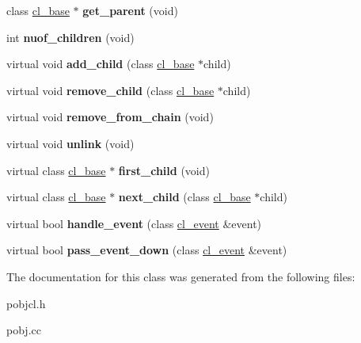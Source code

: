 \begin{DoxyCompactItemize}
\item 
\hypertarget{classcl__base_a9798c52f642c89b813e3535687948f79}{
class \hyperlink{classcl__base}{cl\_\-base} $\ast$ {\bfseries get\_\-parent} (void)}
\label{classcl__base_a9798c52f642c89b813e3535687948f79}

\item 
\hypertarget{classcl__base_a018e2c1c6ef01ca6576f72fbef615106}{
int {\bfseries nuof\_\-children} (void)}
\label{classcl__base_a018e2c1c6ef01ca6576f72fbef615106}

\item 
\hypertarget{classcl__base_a87e97f59dfbba7fcd46255ddd856116c}{
virtual void {\bfseries add\_\-child} (class \hyperlink{classcl__base}{cl\_\-base} $\ast$child)}
\label{classcl__base_a87e97f59dfbba7fcd46255ddd856116c}

\item 
\hypertarget{classcl__base_ab07d05ca13369e1e38a0654abf3d048a}{
virtual void {\bfseries remove\_\-child} (class \hyperlink{classcl__base}{cl\_\-base} $\ast$child)}
\label{classcl__base_ab07d05ca13369e1e38a0654abf3d048a}

\item 
\hypertarget{classcl__base_a8cbaea6347e76bf511c7ed35b2b11e71}{
virtual void {\bfseries remove\_\-from\_\-chain} (void)}
\label{classcl__base_a8cbaea6347e76bf511c7ed35b2b11e71}

\item 
\hypertarget{classcl__base_accdf15ec0a9152dab6cc1138e11a8f14}{
virtual void {\bfseries unlink} (void)}
\label{classcl__base_accdf15ec0a9152dab6cc1138e11a8f14}

\item 
\hypertarget{classcl__base_ae70ac645f46b028ebfd952e73a3dec65}{
virtual class \hyperlink{classcl__base}{cl\_\-base} $\ast$ {\bfseries first\_\-child} (void)}
\label{classcl__base_ae70ac645f46b028ebfd952e73a3dec65}

\item 
\hypertarget{classcl__base_af231ce008f9244729f990bdd123e36cf}{
virtual class \hyperlink{classcl__base}{cl\_\-base} $\ast$ {\bfseries next\_\-child} (class \hyperlink{classcl__base}{cl\_\-base} $\ast$child)}
\label{classcl__base_af231ce008f9244729f990bdd123e36cf}

\item 
\hypertarget{classcl__base_a4bdbcda582c2949ae0afd9383b65bb73}{
virtual bool {\bfseries handle\_\-event} (class \hyperlink{classcl__event}{cl\_\-event} \&event)}
\label{classcl__base_a4bdbcda582c2949ae0afd9383b65bb73}

\item 
\hypertarget{classcl__base_ae56fabf74193c0e4bbd96d96eecda2bb}{
virtual bool {\bfseries pass\_\-event\_\-down} (class \hyperlink{classcl__event}{cl\_\-event} \&event)}
\label{classcl__base_ae56fabf74193c0e4bbd96d96eecda2bb}

\end{DoxyCompactItemize}


The documentation for this class was generated from the following files:\begin{DoxyCompactItemize}
\item 
pobjcl.h\item 
pobj.cc\end{DoxyCompactItemize}

